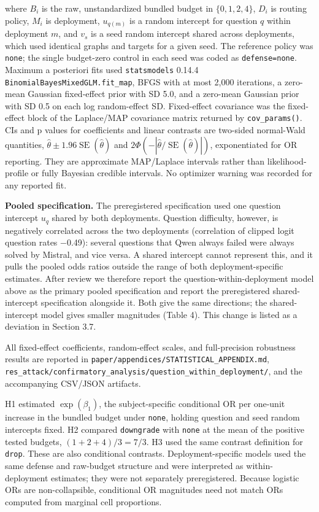 \documentclass[11pt]{article}
\begin{document}
where \(B_i\) is the raw, unstandardized bundled budget in \(\{0,1,2,4\}\), \(D_i\) is routing policy, \(M_i\) is deployment, \(u_{q(m)}\) is a random intercept for question \(q\) within deployment \(m\), and \(v_s\) is a seed random intercept shared across deployments, which used identical graphs and targets for a given seed. The reference policy was \texttt{none}; the single budget-zero control in each seed was coded as \texttt{defense=none}. Maximum a posteriori fits used \texttt{statsmodels} 0.14.4 \texttt{BinomialBayesMixedGLM.fit\_map}, BFGS with at most 2,000 iterations, a zero-mean Gaussian fixed-effect prior with SD 5.0, and a zero-mean Gaussian prior with SD 0.5 on each log random-effect SD. Fixed-effect covariance was the fixed-effect block of the Laplace/MAP covariance matrix returned by \texttt{cov\_params()}. CIs and p values for coefficients and linear contrasts are two-sided normal-Wald quantities, \(\hat\theta\pm1.96\operatorname{SE}(\hat\theta)\) and \(2\Phi(-|\hat\theta/\operatorname{SE}(\hat\theta)|)\), exponentiated for OR reporting. They are approximate MAP/Laplace intervals rather than likelihood-profile or fully Bayesian credible intervals. No optimizer warning was recorded for any reported fit.

\textbf{Pooled specification.} The preregistered specification used one question intercept \(u_q\) shared by both deployments. Question difficulty, however, is negatively correlated across the two deployments (correlation of clipped logit question rates −0.49): several questions that Qwen always failed were always solved by Mistral, and vice versa. A shared intercept cannot represent this, and it pulls the pooled odds ratios outside the range of both deployment-specific estimates. After review we therefore report the question-within-deployment model above as the primary pooled specification and report the preregistered shared-intercept specification alongside it. Both give the same directions; the shared-intercept model gives smaller magnitudes (Table 4). This change is listed as a deviation in Section 3.7.

All fixed-effect coefficients, random-effect scales, and full-precision robustness results are reported in \nolinkurl{paper/appendices/STATISTICAL_APPENDIX.md}, \nolinkurl{res_attack/confirmatory_analysis/question_within_deployment/}, and the accompanying CSV/JSON artifacts.

H1 estimated \(\exp(\beta_1)\), the subject-specific conditional OR per one-unit increase in the bundled budget under \texttt{none}, holding question and seed random intercepts fixed. H2 compared \texttt{downgrade} with \texttt{none} at the mean of the positive tested budgets, \((1+2+4)/3=7/3\). H3 used the same contrast definition for \texttt{drop}. These are also conditional contrasts. Deployment-specific models used the same defense and raw-budget structure and were interpreted as within-deployment estimates; they were not separately preregistered. Because logistic ORs are non-collapsible, conditional OR magnitudes need not match ORs computed from marginal cell proportions.
\end{document}
